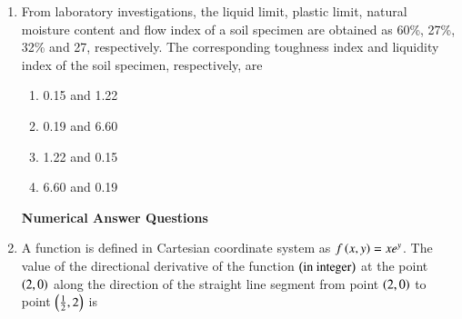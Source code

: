 \documentclass[journal,12pt,onecolumn]{article}
\theoremstyle{remark}
\begin{document}
\begin{enumerate}
\item From laboratory investigations, the liquid limit, plastic limit, natural moisture content and flow index of a soil specimen are obtained as 60\%, 27\%, 32\% and 27, respectively. The corresponding toughness index and liquidity index of the soil specimen, respectively, are

\hfill{}

\begin{multicols}{2}
\begin{enumerate}
    \item 0.15 and 1.22
    \item 0.19 and 6.60
    \item 1.22 and 0.15
    \item 6.60 and 0.19
\end{enumerate}
\end{multicols}

\textbf{Numerical Answer Questions}
\item A function is defined in Cartesian coordinate system as $f\left(x,y\right) = xe^y$. The value of the directional derivative of the function $\left(\text{in integer}\right)$ at the point $\left(2, 0\right)$ along the direction of the straight line segment from point $\left(2, 0\right)$ to point $\left(\frac{1}{2}, 2\right)$ is \underline{\hspace{2cm}}

\hfill{}


\end{enumerate}
\end{document}
